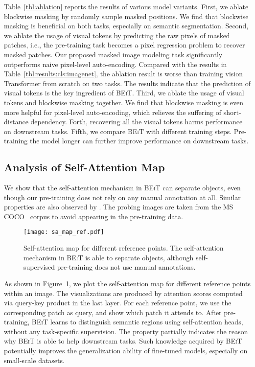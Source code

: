 \documentclass{article}
\newcommand\our{\textsc{BEiT}}
\begin{document}
Table~\ref{tbl:ablation} reports the results of various model variants.
First, we ablate blockwise masking by randomly sample masked positions.
We find that blockwise masking is beneficial on both tasks, especially on semantic segmentation.
Second, we ablate the usage of visual tokens by predicting the raw pixels of masked patches, i.e., the pre-training task becomes a pixel regression problem to recover masked patches.
Our proposed masked image modeling task significantly outperforms naive pixel-level auto-encoding.
Compared with the results in Table~\ref{tbl:results:cls:imagenet}, the ablation result is worse than training vision Transformer from scratch on two tasks.
The results indicate that the prediction of visual tokens is the key ingredient of \our{}.
Third, we ablate the usage of visual tokens and blockwise masking together.
We find that blockwise masking is even more helpful for pixel-level auto-encoding, which relieves the suffering of short-distance dependency.
Forth, recovering all the visual tokens harms performance on downstream tasks.
Fifth, we compare \our{} with different training steps. Pre-training the model longer can further improve performance on downstream tasks.


\subsection{Analysis of Self-Attention Map}
\label{sec:analysis}

We show that the self-attention mechanism in \our{} can separate objects, even though our pre-training does not rely on any manual annotation at all. Similar properties are also observed by \citep{dino}.
The probing images are taken from the MS COCO~\citep{mscoco} corpus to avoid appearing in the pre-training data.


\begin{figure}[t]
\centering
\setlength{\tabcolsep}{3pt}
\texttt{[image: sa\_map\_ref.pdf]}
\caption{
Self-attention map for different reference points.
The self-attention mechanism in \our{} is able to separate objects, although self-supervised pre-training does not use manual annotations.
}
\label{fig:attmap:ref}
\end{figure}


As shown in Figure~\ref{fig:attmap:ref}, we plot the self-attention map for different reference points within an image.
The visualizations are produced by attention scores computed via query-key product in the last layer.
For each reference point, we use the corresponding patch as query, and show which patch it attends to.
After pre-training, \our{} learns to distinguish semantic regions using self-attention heads, without any task-specific supervision.
The property partially indicates the reason why \our{} is able to help downstream tasks.
Such knowledge acquired by \our{} potentially improves the generalization ability of fine-tuned models, especially on small-scale datasets.
\end{document}
